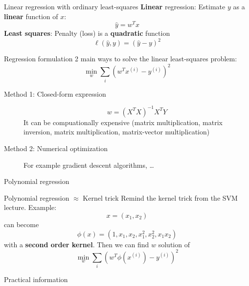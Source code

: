\documentclass{beamer}
\begin{document}
\begin{frame}{Linear regression with ordinary least-squares}
\textbf{Linear} regression: Estimate $y$ as a \textbf{linear} function of $x$:
$$ \hat{y} = w^T x$$
\vfill
\pause
\textbf{Least squares}: Penalty (loss) is a \textbf{quadratic} function
$$ \ell \left( \hat{y}, y \right) = \left( \hat{y} - y\right)^2$$
\end{frame}

\begin{frame}{Regression formulation}
2 main ways to solve the linear least-squares problem:
\begin{equation}
\label{eq:mse}
	\min_w \sum_i \left(w^T x^{(i)} - y^{(i)}\right)^2
\end{equation}

\begin{description}
	\item [Method 1: Closed-form expression]
	$$ w = \left( X^T X \right)^{-1} X^T Y $$
	It can be compuationally expensive (matrix multiplication, matrix inversion, matrix multiplication, matrix-vector multiplication)
	\item [Method 2: Numerical optimization] For example gradient descent algorithms, \ldots
\end{description}
\end{frame}

\begin{frame}
\begin{center}
\Huge{Polynomial regression}
\end{center}
\end{frame}

\begin{frame}{Polynomial regression $\approx$ Kernel trick}
Remind the kernel trick from the SVM lecture. 
\vfill
Example:
$$ x = (x_1, x_2) $$
can become 
$$ \phi(x) = (1, x_1, x_2, x_1^2, x_2^2, x_1x_2)$$
with a \textbf{second order kernel}.
\vfill
Then we can find $w$ solution of
\begin{equation}
\label{eq:mse}
	\min_w \sum_i \left(w^T \phi\left(x^{(i)}\right) - y^{(i)}\right)^2
\end{equation}
\end{frame}

\begin{frame}
\begin{center}
\Huge{Practical information}
\end{center}
\end{frame}
\end{document}
